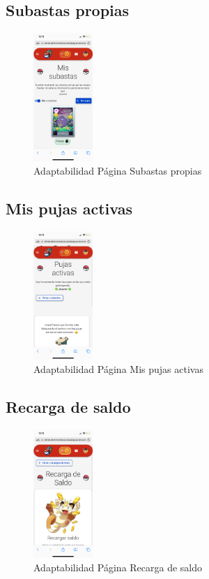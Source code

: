 \subsection*{Subastas propias}
\begin{figure}[H]
    \centering
    \includegraphics[width=0.2\textwidth]{figures/adaptabilidad/mis_subastas.png}
    \caption{Adaptabilidad Página Subastas propias}
    \label{fig:Adap-Mis-Subastas}
\end{figure}

\subsection*{Mis pujas activas}
\begin{figure}[H]
    \centering
    \includegraphics[width=0.2\textwidth]{figures/adaptabilidad/pujas.png}
    \caption{Adaptabilidad Página Mis pujas activas}
    \label{fig:Adap-Mis-Pujas}
\end{figure}

\subsection*{Recarga de saldo}
\begin{figure}[H]
    \centering
    \includegraphics[width=0.2\textwidth]{figures/adaptabilidad/recarga.png}
    \caption{Adaptabilidad Página Recarga de saldo}
    \label{fig:Adap-Recarga}
\end{figure}

